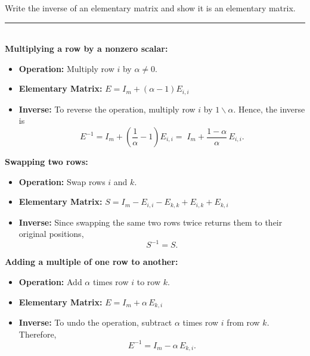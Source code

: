\documentclass[a4paper, 9pt]{extarticle}
\begin{document}
\begin{examplebox}{}{}
  Write the inverse of an elementary matrix and show it is an elementary matrix.
  \\ \rule{\textwidth}{1px} \\
  \textbf{Multiplying a row by a nonzero scalar:}
  \begin{itemize}
    \item \textbf{Operation:} Multiply row $i$ by $\alpha \neq 0$.
    \item \textbf{Elementary Matrix:} $E = I_m + (\alpha - 1)E_{i,i}$
    \item \textbf{Inverse:} To reverse the operation, multiply row $i$ by $1\backslash\alpha$. Hence, the inverse is
          $$
            E^{-1} = I_m + \left(\frac{1}{\alpha} - 1\right)E_{i,i}  =\; I_m + \frac{1-\alpha}{\alpha}\,E_{i,i}.
          $$
  \end{itemize}
  \textbf{Swapping two rows:}
  \begin{itemize}
    \item \textbf{Operation:} Swap rows $i$ and $k$.
    \item \textbf{Elementary Matrix:} $S = I_m - E_{i,i} - E_{k,k} + E_{i,k} + E_{k,i}$
    \item \textbf{Inverse:} Since swapping the same two rows twice returns them to their original positions,
          $$
            S^{-1} = S.
          $$
  \end{itemize}
  \textbf{Adding a multiple of one row to another:}
  \begin{itemize}
    \item \textbf{Operation:} Add $\alpha$ times row $i$ to row $k$.
    \item \textbf{Elementary Matrix:} $E = I_m + \alpha\,E_{k,i}$
    \item \textbf{Inverse:} To undo the operation, subtract $\alpha$ times row $i$ from row $k$. Therefore,
          $$
            E^{-1} = I_m - \alpha\,E_{k,i}.
          $$
  \end{itemize}
\end{examplebox}
\end{document}
